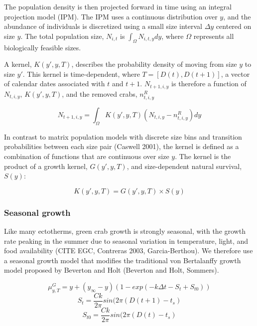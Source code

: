 \documentclass{article}
\begin{document}
The population density is then projected forward in time using an integral projection model (IPM). The IPM uses a continuous distribution over $y$, and the abundance of individuals is discretized using a small size interval $\Delta y$ centered on size $y$. The total population size, $N_{i,t}$ is $\int_{\Omega} N_{i,t,y} dy$, where $\Omega$ represents all biologically feasible sizes.

A kernel, $K(y', y, T)$, describes the probability density of moving from size $y$ to size $y'$. This kernel is time-dependent, where $T = [D(t), D(t+1)]$, a vector of calendar dates associated with $t$ and $t+1$. $N_{t+1,i,y}$ is therefore a function of $N_{t,i,y}$, $K(y', y, T)$, and the removed crabs, $n^R_{t,i,y}$

\begin{equation}
N_{t+1,i,y} = \int_{\Omega} K(y',y, T) (N_{t,i,y} - n^R_{t,i,y}) dy 
\end{equation}

In contrast to matrix population models with discrete size bins and transition probabilities between each size pair (Caswell 2001), the kernel is defined as a combination of functions that are continuous over size $y$. The kernel is the product of a growth kernel, $G(y',y, T)$, and size-dependent natural survival, $S(y)$:

\begin{equation}
K(y',y, T) = G(y',y, T) \times S(y)
\end{equation}

\subsubsection*{Seasonal growth}

Like many ectotherms, green crab growth is strongly seasonal, with the growth rate peaking in the summer due to seasonal variation in temperature, light, and food availability (CITE EGC, Contreras 2003, Garcia-Berthou). We therefore use a seasonal growth model that modifies the traditional von Bertalanffy growth model proposed by Beverton and Holt (Beverton and Holt, Sommers).

\begin{equation}
\mu^G_{y,T} = y + (y_{\infty}-y)(1-exp(-k\Delta t-S_t+S_{t0}))
\end{equation}
\begin{equation}
S_t = \frac{Ck}{2\pi} sin(2\pi(D(t+1)-t_s)
\end{equation}
\begin{equation}
S_{t0} = \frac{Ck}{2\pi} sin(2\pi(D(t)-t_s)
\end{equation}
\end{document}
